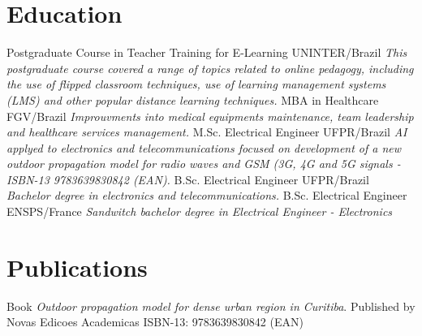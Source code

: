 \documentclass[letterpaper]{twentysecondcv} %
\begin{document}
\section{Education}

\begin{twenty} %
						{\normalfont Postgraduate Course in \newline Teacher Training for 
						E-Learning}
						{UNINTER/Brazil}
						{\emph{This postgraduate course covered a range of topics related to
						online pedagogy, including the use of flipped classroom techniques,
						use of learning management systems (LMS) and other popular distance
						learning techniques.}}
						{MBA in Healthcare}
						{FGV/Brazil}
						{\emph{Improuvments into medical equipments maintenance, team 
						leadership and healthcare services management.}}
						{M.Sc. Electrical Engineer}
						{UFPR/Brazil}
						{\emph{AI applyed to electronics and telecommunications focused on
						development of a new outdoor propagation model for radio waves
						and GSM (3G, 4G and 5G signals - ISBN-13 9783639830842 (EAN).}}
						{B.Sc. Electrical Engineer}
						{UFPR/Brazil}
						{\emph{Bachelor degree in electronics and telecommunications.}}
						{B.Sc. Electrical Engineer}
						{ENSPS/France}
						{\emph{Sandwitch bachelor degree in Electrical Engineer - Electronics}}
\end{twenty}


\section{Publications}

 \begin{twentyshort} %
									 {Book}
									 {\emph{Outdoor propagation model for dense urban region in 
									  Curitiba}. \newline Published by Novas Edicoes Academicas
										\newline 
										ISBN-13: 9783639830842 (EAN)}
 \end{twentyshort}
\end{document}

